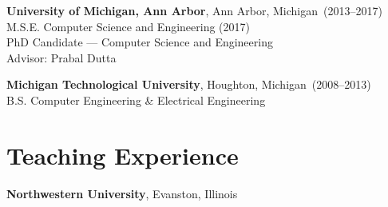 \documentclass{article}
\begin{document}
{\bf University of Michigan, Ann Arbor}, Ann Arbor, Michigan~(2013--2017) \\
M.S.E. Computer Science and Engineering (2017) \\
PhD Candidate --- Computer Science and Engineering \\
Advisor: Prabal Dutta

{\bf Michigan Technological University}, Houghton, Michigan~(2008--2013) \\
B.S. Computer Engineering \& Electrical Engineering \\


\section*{Teaching Experience}
\vspace{-6pt}
{\bf Northwestern University}, Evanston, Illinois
\vspace{-6pt}
\end{document}
